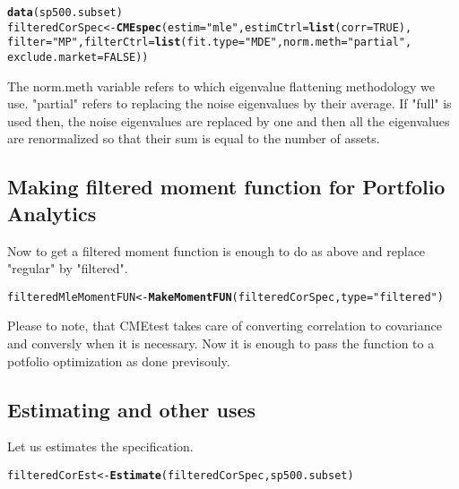 \documentclass[12pt,letterpaper,english]{article}\usepackage[]{graphicx}\usepackage[]{color}
\makeatletter
\newcommand{\hlnum}[1]{\textcolor[rgb]{0.686,0.059,0.569}{#1}}%
\newcommand{\hlstr}[1]{\textcolor[rgb]{0.192,0.494,0.8}{#1}}%
\newcommand{\hlstd}[1]{\textcolor[rgb]{0.345,0.345,0.345}{#1}}%
\newcommand{\hlkwb}[1]{\textcolor[rgb]{0.69,0.353,0.396}{#1}}%
\newcommand{\hlkwc}[1]{\textcolor[rgb]{0.333,0.667,0.333}{#1}}%
\newcommand{\hlkwd}[1]{\textcolor[rgb]{0.737,0.353,0.396}{\textbf{#1}}}%
\newenvironment{kframe}{%
 \def\at@end@of@kframe{}%
 \ifinner\ifhmode%
  \def\at@end@of@kframe{\end{minipage}}%
  \begin{minipage}{\columnwidth}%
 \fi\fi%
 \def\FrameCommand##1{\hskip\@totalleftmargin \hskip-\fboxsep
 \colorbox{shadecolor}{##1}\hskip-\fboxsep
     \hskip-\linewidth \hskip-\@totalleftmargin \hskip\columnwidth}%
 \MakeFramed {\advance\hsize-\width
   \@totalleftmargin\z@ \linewidth\hsize
   \@setminipage}}%
 {\par\unskip\endMakeFramed%
 \at@end@of@kframe}
\newenvironment{knitrout}{}{} %
\makeatother
\begin{document}
\begin{knitrout}
\color{fgcolor}\begin{kframe}
\begin{alltt}
\hlkwd{data}\hlstd{(sp500.subset)}
\hlstd{filteredCorSpec} \hlkwb{<-} \hlkwd{CMEspec}\hlstd{(}\hlkwc{estim} \hlstd{=} \hlstr{"mle"}\hlstd{,} \hlkwc{estimCtrl} \hlstd{=} \hlkwd{list}\hlstd{(}\hlkwc{corr} \hlstd{=} \hlnum{TRUE}\hlstd{),}
    \hlkwc{filter} \hlstd{=} \hlstr{"MP"}\hlstd{,} \hlkwc{filterCtrl} \hlstd{=} \hlkwd{list}\hlstd{(}\hlkwc{fit.type} \hlstd{=} \hlstr{"MDE"}\hlstd{,} \hlkwc{norm.meth} \hlstd{=} \hlstr{"partial"}\hlstd{,}
        \hlkwc{exclude.market} \hlstd{=} \hlnum{FALSE}\hlstd{))}
\end{alltt}
\end{kframe}
\end{knitrout}

The norm.meth variable refers to which eigenvalue flattening methodology we use. "partial" refers to replacing the noise eigenvalues by their average. If "full" is used then, the noise eigenvalues are replaced by one and then all the eigenvalues are renormalized so that their sum is equal to the number of assets.
\subsection{Making filtered moment function for Portfolio Analytics}
Now to get a filtered moment function is enough to do as above and replace "regular" by "filtered".
\begin{knitrout}
\color{fgcolor}\begin{kframe}
\begin{alltt}
\hlstd{filteredMleMomentFUN} \hlkwb{<-} \hlkwd{MakeMomentFUN}\hlstd{(filteredCorSpec,} \hlkwc{type} \hlstd{=} \hlstr{"filtered"}\hlstd{)}
\end{alltt}
\end{kframe}
\end{knitrout}

Please to note, that CMEtest takes care of converting correlation to covariance and conversly when it is necessary.
Now it is enough to pass the function to a potfolio optimization as done previsouly.

\subsection{Estimating and other uses}
Let us estimates the specification.
\begin{knitrout}
\color{fgcolor}\begin{kframe}
\begin{alltt}
\hlstd{filteredCorEst} \hlkwb{<-} \hlkwd{Estimate}\hlstd{(filteredCorSpec, sp500.subset)}
\end{alltt}
\end{kframe}
\end{knitrout}
\end{document}
